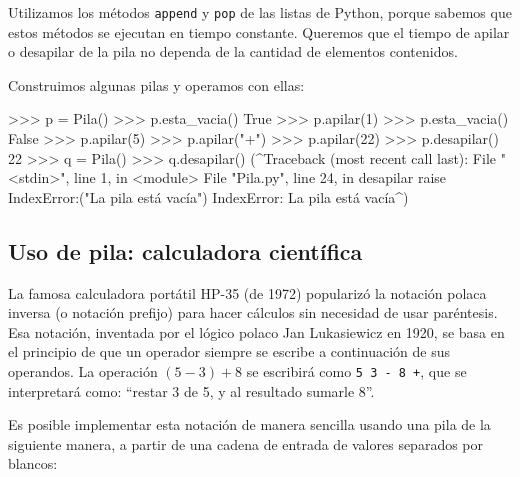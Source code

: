 \begin{observacion}
Utilizamos los métodos \lstinline!append! y \lstinline!pop! de las listas de
Python, porque sabemos que estos métodos se ejecutan en tiempo constante.
Queremos que el tiempo de apilar o desapilar de la pila no dependa de la
cantidad de elementos contenidos.
\end{observacion}

Construimos algunas pilas y operamos con ellas:

\begin{codigo-python-sn}
>>> p = Pila()
>>> p.esta_vacia()
True
>>> p.apilar(1)
>>> p.esta_vacia()
False
>>> p.apilar(5)
>>> p.apilar("+")
>>> p.apilar(22)
>>> p.desapilar()
22
>>> q = Pila()
>>> q.desapilar()
(^Traceback (most recent call last):
  File "<stdin>", line 1, in <module>
  File "Pila.py", line 24, in desapilar
    raise IndexError:("La pila está vacía")
IndexError: La pila está vacía^)
\end{codigo-python-sn}

\subsection{Uso de pila: calculadora científica}

La famosa calculadora portátil HP-35 (de 1972) popularizó la notación
polaca inversa (o notación prefijo) para hacer cálculos sin necesidad de
usar paréntesis. Esa notación, inventada por el lógico polaco Jan
Lukasiewicz en 1920, se basa en el principio de que un operador siempre se
escribe a continuación de sus operandos. La operación $(5-3)+8$ se
escribirá como \lstinline|5 3 - 8 +|, que se interpretará como: ``restar 3
de 5, y al resultado sumarle 8''.

Es posible implementar esta notación de manera sencilla usando una pila de
la siguiente manera, a partir de una cadena de entrada de valores separados
por blancos:

